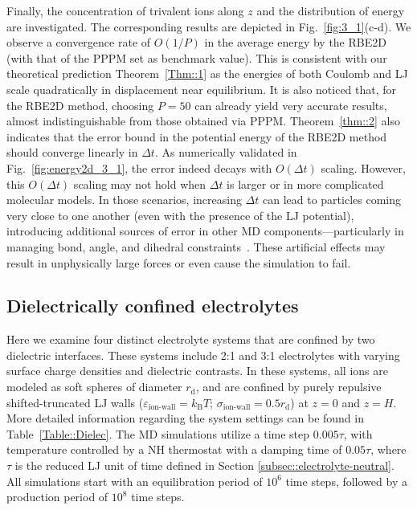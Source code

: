 Finally, the concentration of trivalent ions along $z$ and the distribution of energy are investigated.
The corresponding results are depicted in Fig.~\ref{fig:3_1}(c-d). 
We observe a convergence rate of $O(1/P)$ in the average energy by the RBE2D (with that of the PPPM set as benchmark value). 
This is consistent with our theoretical prediction Theorem~\ref{Thm::1} as the energies of both Coulomb and LJ scale quadratically in displacement near equilibrium.
It is also noticed that, for the RBE2D method, choosing $P=50$ can already yield very accurate results, almost indistinguishable from those obtained via PPPM. 
 {Theorem~\ref{thm::2} also indicates that the error bound in the potential energy of the RBE2D method should converge linearly in $\Delta t$. 
 As numerically validated in Fig.~\ref{fig:energy2d_3_1}, the error indeed decays with $O(\Delta t)$ scaling. However, this $O(\Delta t)$ scaling may not hold when $\Delta t$ is larger or in more complicated molecular models. 
 In those scenarios, increasing \(\Delta t\) can lead to particles coming very close to one another (even with the presence of the LJ potential), introducing additional sources of error in other MD components—particularly in managing bond, angle, and dihedral constraints~\cite{frenkel2023understanding}. These artificial effects may result in unphysically large forces or even cause the simulation to fail.}

\subsection{Dielectrically confined electrolytes}

Here we examine four distinct electrolyte systems that are confined by two dielectric interfaces.
These systems include 2:1 and 3:1 electrolytes with varying surface charge densities and dielectric contrasts.
In these systems, all ions are modeled as soft spheres of diameter $r_{\text{d}}$, and are confined by purely repulsive shifted-truncated LJ walls ($\varepsilon_{\text{ion-wall}}=k_{\text{B}}T$; $\sigma_{\text{ion-wall}}=0.5r_{\text{d}}$) at $z=0$ and $z=H$. More detailed information regarding the system settings can be found in Table~\ref{Table::Dielec}.
The MD simulations utilize a time step $0.005\tau$, with temperature controlled by a NH thermostat %
with a damping time of $0.05\tau$,  {where $\tau$ is the reduced LJ unit of time defined in Section \ref{subsec::electrolyte-neutral}}.
All simulations start with an equilibration period of $10^6$ time steps, followed by a production period of $10^8$ time steps.

